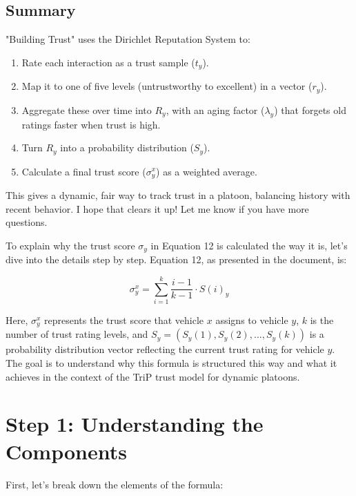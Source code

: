 \documentclass{article}
\begin{document}
\subsection*{Summary}
"Building Trust" uses the Dirichlet Reputation System to:
\begin{enumerate}
    \item Rate each interaction as a trust sample (\(t_y\)).
    \item Map it to one of five levels (untrustworthy to excellent) in a vector (\(r_y\)).
    \item Aggregate these over time into \(R_y\), with an aging factor (\(\lambda_y\)) that forgets old ratings faster when trust is high.
    \item Turn \(R_y\) into a probability distribution (\(S_y\)).
    \item Calculate a final trust score (\(\sigma_y^x\)) as a weighted average.
\end{enumerate}

This gives a dynamic, fair way to track trust in a platoon, balancing history with recent behavior. I hope that clears it up! Let me know if you have more questions.



To explain why the trust score \(\sigma_y\) in Equation 12 is calculated the way it is, let’s dive into the details step by step. Equation 12, as presented in the document, is:

\[
\sigma_y^x = \sum_{i=1}^k \frac{i-1}{k-1} \cdot S(i)_y
\]

Here, \(\sigma_y^x\) represents the trust score that vehicle \(x\) assigns to vehicle \(y\), \(k\) is the number of trust rating levels, and \(S_y = (S_y(1), S_y(2), \ldots, S_y(k))\) is a probability distribution vector reflecting the current trust rating for vehicle \(y\). The goal is to understand why this formula is structured this way and what it achieves in the context of the TriP trust model for dynamic platoons.

\section*{Step 1: Understanding the Components}
First, let’s break down the elements of the formula:
\end{document}
